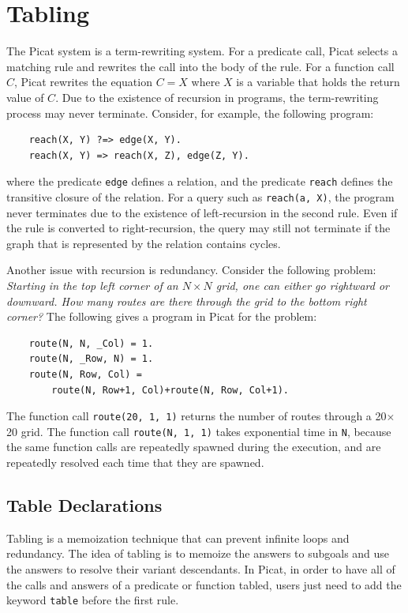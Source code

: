 \chapter{\label{chapter:tabling}Tabling}
The Picat system is a term-rewriting system. For a predicate call, Picat selects a matching rule and rewrites the call into the body of the rule. For a function call $C$, Picat rewrites the equation $C = X$ where $X$ is a variable that holds the return value of $C$. Due to the existence of recursion in programs, the term-rewriting process may never terminate. Consider, for example, the following program:  
\begin{verbatim}
    reach(X, Y) ?=> edge(X, Y).
    reach(X, Y) => reach(X, Z), edge(Z, Y).
\end{verbatim}
where the predicate \texttt{edge} defines a relation, and the predicate \texttt{reach} defines the transitive closure of the relation. For a query such as \texttt{reach(a, X)}, the program never terminates due to the existence of left-recursion in the second rule. Even if the rule is converted to right-recursion, the query may still not terminate if the graph that is represented by the relation contains cycles. 

Another issue with recursion is redundancy. Consider the following problem: \emph{Starting in the top left corner of an $N\times N$ grid, one can either go rightward or downward. How many routes are there through the grid to the bottom right corner?} The following gives a program in Picat for the problem:
\begin{verbatim}
    route(N, N, _Col) = 1.
    route(N, _Row, N) = 1.
    route(N, Row, Col) = 
        route(N, Row+1, Col)+route(N, Row, Col+1).
\end{verbatim}
The function call \texttt{route(20, 1, 1)} returns the number of routes through a 20$\times$20 grid. The function call \texttt{route(N, 1, 1)} takes exponential time in \texttt{N}, because the same function calls are repeatedly spawned during the execution, and are repeatedly resolved each time that they are spawned.

\section{Table Declarations}
Tabling is a memoization technique that can prevent infinite loops and redundancy. The idea of tabling is to memoize the answers to subgoals and use the answers to resolve their variant descendants. In Picat, in order to have all of the calls and answers of a predicate or function tabled, users just need to add the keyword \texttt{table} before the first rule.

